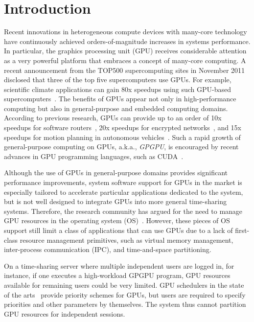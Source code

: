 \section{Introduction}
\label{sec:introduction}

Recent innovations in heterogeneous compute devices with many-core
technology have continuously achieved orders-of-magnitude increases in
systems performance. 
In particular, the graphics processing unit (GPU) receives considerable
attention as a very powerful platform that embraces a concept of
many-core computing.
A recent announcement from the TOP500 supercomputing sites in November
2011~\cite{TOP500} disclosed that three of the top five supercomputers
use GPUs.
For example, scientific climate applications can gain 80x speedups using
such GPU-based supercomputers~\cite{Shimokawabe10}.
The benefits of GPUs appear not only in high-performance computing but
also in general-purpose and embedded computing domains.
According to previous research, GPUs can provide up to an order of 10x
speedups for software routers~\cite{Han_SIGCOMM10}, 20x speedups for
encrypted networks~\cite{Jang_NSDI11}, and 15x speedups for motion
planning in autonomous vehicles~\cite{McNaughton_ICRA11}.
Such a rapid growth of general-purpose computing on GPUs,
a.k.a., \textit{GPGPU}, is encouraged by recent advances in GPU
programming languages, such as CUDA~\cite{CUDA40}.

Although the use of GPUs in general-purpose domains provides significant
performance improvements, system software support for GPUs in the market
is especially  tailored to accelerate particular applications dedicated
to the system, but is not well designed to integrate GPUs into more
general time-sharing systems.
Therefore, the research community has argued for the need to manage GPU
resources in the operating system (OS)~\cite{Bautin_MCNC08, Kato_ATC11,
Rossbach_SOSP11}.
However, these pieces of OS support still limit a class of applications
that can use GPUs due to a lack of first-class resource management
primitives, such as virtual memory management, inter-process
communication (IPC), and time-and-space partitioning.

On a time-sharing server where multiple independent users are logged in,
for instance, if one executes a high-workload GPGPU program, GPU
resources available for remaining users could be very limited. 
GPU schedulers in the state of the arts~\cite{Kato_ATC11,
Rossbach_SOSP11} provide priority schemes for GPUs, but users
are required to specify priorities and other parameters by themselves.
The system thus cannot partition GPU resources for independent sessions.

